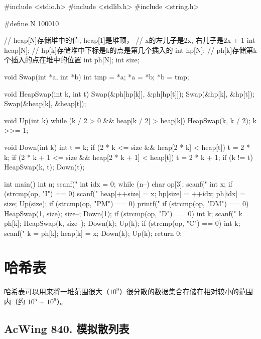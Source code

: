 \begin{mycpptwocol}[可修改任意元素的堆]
#include <stdio.h>
#include <stdlib.h>
#include <string.h>

#define N 100010

// heap[N]存储堆中的值, heap[1]是堆顶，
// x的左儿子是2x, 右儿子是2x + 1
int heap[N];
// hp[k]存储堆中下标是k的点是第几个插入的
int hp[N];
// ph[k]存储第k个插入的点在堆中的位置
int ph[N];
int size;

void Swap(int *a, int *b)
{
    int tmp = *a;
    *a = *b;
    *b = tmp;
}

void HeapSwap(int k, int t)
{
    Swap(&ph[hp[k]], &ph[hp[t]]);
    Swap(&hp[k], &hp[t]);
    Swap(&heap[k], &heap[t]);
}

void Up(int k)
{
    while (k / 2 > 0 &&
        heap[k / 2] > heap[k]) {
        HeapSwap(k, k / 2);
        k >>= 1;
    }
}

void Down(int k)
{
    int t = k;
    if (2 * k <= size &&
        heap[2 * k] < heap[t]) {
        t = 2 * k;
    }
    if (2 * k + 1 <= size &&
        heap[2 * k + 1] < heap[t]) {
        t = 2 * k + 1;
    }
    if (k != t) {
        HeapSwap(k, t);
        Down(t);
    }
}

int main()
{
    int n;
    scanf("%
    int idx = 0;
    while (n--) {
        char op[3];
        scanf("%
        int x;
        if (strcmp(op, "I") == 0) {
            scanf("%
            heap[++size] = x;
            hp[size] = ++idx;
            ph[idx] = size;
            Up(size);
        }
        if (strcmp(op, "PM") == 0) {
            printf("%
        }
        if (strcmp(op, "DM") == 0) {
            HeapSwap(1, size);
            size--;
            Down(1);
        }
        if (strcmp(op, "D") == 0) {
            int k;
            scanf("%
            k = ph[k];
            HeapSwap(k, size--);
            Down(k);
            Up(k);
        }
        if (strcmp(op, "C") == 0) {
            int k;
            scanf("%
            k = ph[k];
            heap[k] = x;
            Down(k);
            Up(k);
        }
    }
    return 0;
}
\end{mycpptwocol}

\section{哈希表}
哈希表可以用来将一堆范围很大（$10^9$）很分散的数据集合存储在相对较小的范围内（约 $10^5 \sim 10^6$）。

\subsection{AcWing 840. 模拟散列表}

